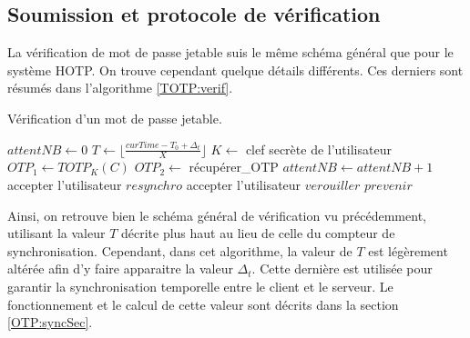 \documentclass{../res/univ-projet}
\begin{document}
  \subsection{Soumission et protocole de vérification}
    La vérification de mot de passe jetable suis le même schéma général que pour le système \og{}HOTP\fg{}. On trouve cependant quelque détails différents. Ces derniers 
    sont résumés dans l'algorithme \ref{TOTP:verif}.
    \begin{algorithm}
      \caption{Vérification d'un mot de passe jetable.}
      \label{TOTP:verif}
      
      \begin{algorithmic}
	\STATE $attentNB \leftarrow 0$
	\STATE $T \leftarrow \lfloor{}\frac{curTime - T_0 + \Delta_t}{X}\rfloor{}$
	\STATE $K \leftarrow$ clef secrète de l'utilisateur
	\STATE $OTP_1 \leftarrow TOTP_K(C)$
	  \STATE $OTP_2 \leftarrow$ récupérer\_OTP
	  \STATE $attentNB \leftarrow attentNB + 1$
	    \STATE accepter l'utilisateur
	  \ELSE
	      \STATE $resynchro$
	      \STATE accepter l'utilisateur
	    \ENDIF
	  \ENDIF
	\ENDWHILE
	\STATE $verouiller$
	\STATE $prevenir$
      \end{algorithmic}
    \end{algorithm}
    Ainsi, on retrouve bien le schéma général de vérification vu précédemment, utilisant la valeur $T$ décrite plus haut au lieu de celle du compteur de synchronisation.
    Cependant, dans cet algorithme, la valeur de $T$ est légèrement altérée afin d'y faire apparaitre la valeur $\Delta_t$. Cette dernière est utilisée pour garantir la 
    synchronisation temporelle entre le client et le serveur. Le fonctionnement et le calcul de cette valeur sont décrits dans la section \ref{OTP:syncSec}.
    
\end{document}
